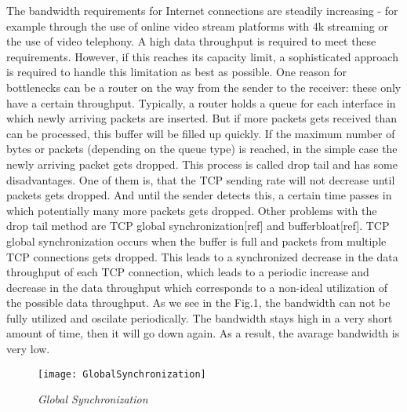 The bandwidth requirements for Internet connections are steadily increasing - for example through the use of online video stream platforms with 4k streaming or the use of video telephony. A high data throughput is required to meet these requirements. However, if this reaches its capacity limit, a sophisticated approach is required to handle this limitation as best as possible. \newline
One reason for bottlenecks can be a router on the way from the sender to the receiver: these only have a certain throughput. Typically, a router holds a queue for each interface in which newly arriving packets are inserted. But if more packets gets received than can be processed, this buffer will be filled up quickly. If the maximum number of bytes or packets (depending on the queue type) is reached, in the simple case the newly arriving packet gets dropped. This process is called drop tail and has some disadvantages. \newline
One of them is, that the TCP sending rate will not decrease until packets gets dropped. And until the sender detects this, a certain time passes in which potentially many more packets gets dropped. \newline
Other problems with the drop tail method are TCP global synchronization[ref] and bufferbloat[ref]. TCP global synchronization occurs when the buffer is full and packets from multiple TCP connections gets dropped. This leads to a synchronized decrease in the data throughput of each TCP connection, which leads to a periodic increase and decrease in the data throughput which corresponds to a non-ideal utilization of the possible data throughput. As we see in the Fig.1, the bandwidth can not be fully utilized and oscilate periodically. The bandwidth stays high in a very short amount of time, then it will go down again. As a result, the avarage bandwidth is very low.

\begin{figure}[h]
\centering
\texttt{[image: GlobalSynchronization]}
\caption{\em Global Synchronization}
\label{fig:tcp}
\end{figure}

